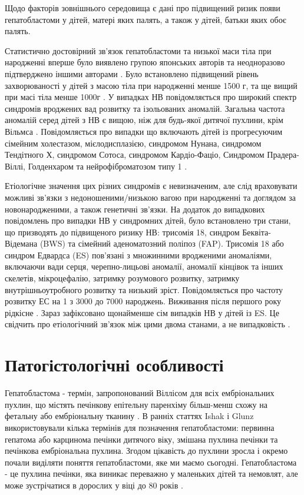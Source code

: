 Щодо факторів зовнішнього середовища є дані про підвищений ризик появи гепатобластоми у дітей, матері яких палять, а також у дітей, батьки яких обоє палять. 

Статистично достовірний зв'язок гепатобластоми та низької маси тіла при народженні вперше було виявлено групою японських авторів \cite{pmid14752798} та неодноразово підтверджено іншими авторами \cite{pmid14746860}. Було встановлено підвищений рівень захворюваності у дітей з масою тіла при народженні менше 1500 г, та ще вищий при масі тіла менше 1000г \cite{pmid15285242}.
У випадках НВ повідомляється про широкий спектр синдромів вроджених вад розвитку та ізольованих аномалій. Загальна частота аномалій серед дітей з НВ є вищою, ніж для будь-якої дитячої пухлини, 
крім Вільмса \cite{pmid15285242}. Повідомляється про випадки що включають дітей із прогресуючим сімейним холестазом, мієлодисплазією, синдромом Нунана, синдромом Тендітного Х, синдромом Сотоса, синдромом Кардіо-Фаціо, Синдромом Прадера-Віллі, Голденхаром та нейрофіброматозом типу 1 \cite{pmid25649007}.

Етіологічне значення цих різних синдромів є невизначеним, але слід враховувати можливі зв’язки з недоношеними/низькою вагою при народженні та доглядом за новонародженими, а також генетичні зв’язки.
На додаток до випадкових повідомлень про випадки НВ у синдромних дітей, було встановлено три стани, що призводять до підвищеного ризику НВ: трисомія 18, синдром Беквіта-Відемана (BWS) та сімейний аденоматозний поліпоз (FAP). Трисомія 18 або синдром Едвардса (ES) пов'язані з множинними вродженими аномаліями, включаючи вади серця, черепно-лицьові аномалії, аномалії кінцівок та інших скелетів, мікроцефалію, затримку розумового розвитку, затримку внутрішньоутробного розвитку та низький зріст. 
Повідомляється про частоту розвитку ЕС на 1 з 3000 до 7000 народжень. Виживання після першого року рідкісне \cite{pmid14966740}. Зараз зафіксовано щонайменше сім випадків НВ у дітей із ES. Це свідчить про етіологічний зв’язок між цими двома станами, а не випадковість \cite{pmid14966739}. 

\section{Патогістологічні особливості}
Гепатобластома - термін, запропонований Віллісом для всіх ембріональних пухлин, що містять печінкову епітельну паренхіму більш-менш схожу на фетальну або ембріональну тканину \cite{pmid20070564}. В ранніх статтях Ishak і Glunz використовували кілька термінів для позначення гепатобластоми: первинна гепатома або карцинома печінки дитячого віку, змішана пухлина печінки та печінкова ембріональна пухлина. Згодом цікавість до пухлини зросла і окремо почали виділяти поняття гепатобластоми, яке ми маємо сьогодні. Гепатобластома - це пухлина печінки, яка виникає переважно у маленьких дітей та немовлят, але може зустрічатися в дорослих у віці до 80 років \cite{pmid11792985}.

